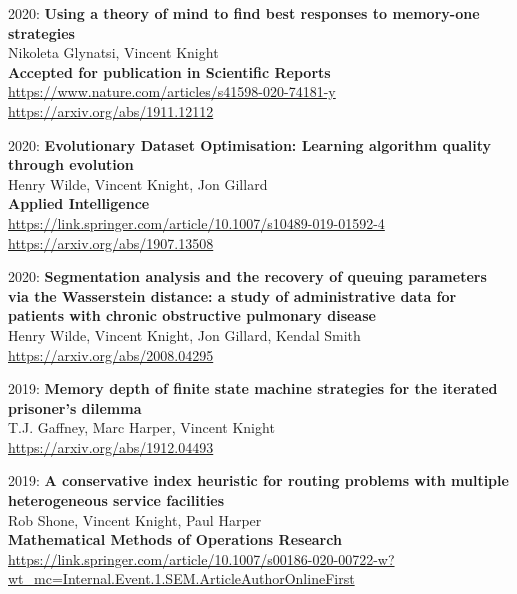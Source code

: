 \documentclass[10pt]{res} %
\begin{document}
\begin{resume}
\begin{etaremune}
\item
2020: \textbf{Using a theory of mind to find best responses to memory-one strategies}\\
Nikoleta Glynatsi, Vincent Knight
\\
\textbf{Accepted for publication in Scientific Reports}
\\
\url{https://www.nature.com/articles/s41598-020-74181-y}
\\
\url{https://arxiv.org/abs/1911.12112}
\\

\item
2020: \textbf{Evolutionary Dataset Optimisation: Learning algorithm quality through evolution}\\
Henry Wilde, Vincent Knight, Jon Gillard
\\
\textbf{Applied Intelligence}
\\
\url{https://link.springer.com/article/10.1007/s10489-019-01592-4}
\\
\url{https://arxiv.org/abs/1907.13508}
\\

\item
2020: \textbf{Segmentation analysis and the recovery of queuing parameters via the Wasserstein distance: a study of administrative data for patients with chronic obstructive pulmonary disease}\\
Henry Wilde, Vincent Knight, Jon Gillard, Kendal Smith
\\
\url{https://arxiv.org/abs/2008.04295}
\\

\item
2019: \textbf{Memory depth of finite state machine strategies for the iterated prisoner's dilemma}\\
T.J. Gaffney, Marc Harper, Vincent Knight
\\
\url{https://arxiv.org/abs/1912.04493}
\\

\item
2019: \textbf{A conservative index heuristic for routing problems with multiple heterogeneous service facilities}\\
Rob Shone, Vincent Knight, Paul Harper
\\
\textbf{Mathematical Methods of Operations Research}
\\
\url{https://link.springer.com/article/10.1007/s00186-020-00722-w?wt_mc=Internal.Event.1.SEM.ArticleAuthorOnlineFirst}
\\


\end{etaremune}
\end{resume}
\end{document}
